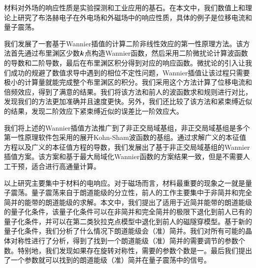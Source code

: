 \begin{cabstract}
  材料对外场的响应性质是实验探测和工业应用的基石。在本文中，我们数值上和理论上研究了布洛赫电子在外电场和外磁场中的响应性质，具体的例子是位移电流和量子震荡。

  我们发展了一套基于Wannier插值的计算二阶非线性效应的第一性原理方法。该方法首先通过布里渊区少数$\boldsymbol{k}$点构造Wannier函数，然后采用二阶微扰论计算波函数的导数和二阶导数，最后在布里渊区积分得到对应的响应函数。微扰论的引入让我们成功的规避了数值求导中遇到的相位不定性问题，Wannier插值让该过程只需要极小的计算量就能完成整个布里渊区的积分。我们采用这个方法计算了位移电流和倍频效应，得到了满意的结果。我们将该方法和前人的波函数求和规则进行对比，发现我们的方法更加准确并且速度更快。另外，我们还比较了该方法和紧束缚近似的结果，发现二阶效应下紧束缚近似的误差比一阶效应大。

  我们将上述的Wannier插值方法推广到了非正交局域基组，非正交局域基组是多个第一性原理软件包采用的展开Kohn-Sham波函数的基组。通过求解广义的本征值方程以及广义的本征值方程的导数，我们发展出了基于非正交局域基组的Wannier插值方案。该方案和基于最大局域化Wannier函数的方案结果一致，但是不需要人工干预，适合进行高通量计算。

  以上研究主要集中于材料的电响应。对于磁场而言，材料最重要的现象之一就是量子震荡。量子震荡来自于朗道能级的分立性，前人的工作主要集中于非简并和完全简并的能带的朗道能级的求解。本文中，我们提出了适用于近简并能带的朗道能级的量子化条件，该量子化条件可以在非简并和完全简并的极限下退化到前人已有的量子化条件，并可以在第二类狄拉克点模型中退化到前人的磁隧穿模型。基于新的量子化条件，我们分析了什么情况下朗道能级会（准）简并。我们对所有可能的晶体对称性进行了分析，得到了找到一个朗道能级（准）简并的需要调节的参数个数。特别地，我们发现如果存在旋转对称性，需要的参数个数是一。最后我们提出了一个参数就可以找到的朗道能级（准）简并在量子震荡中的信号。
\end{cabstract}


